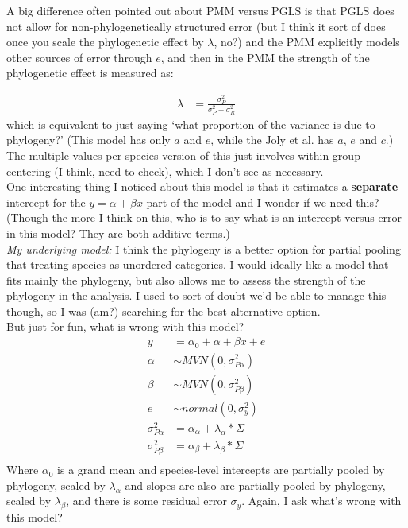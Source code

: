 \documentclass[11pt,letter]{article}
\begin{document}
A big difference often pointed out about PMM versus PGLS is that PGLS does not allow for non-phylogenetically structured error (but I think it sort of does once you scale the phylogenetic effect by $\lambda$, no?) and the PMM explicitly models other sources of error through $e$, and then in the PMM the strength of the phylogenetic effect is measured as:

\begin{align}
\lambda & = \frac{\sigma^2_P}{\sigma^2_P+\sigma^2_R}
\end{align}
which is equivalent to just saying `what proportion of the variance is due to phylogeny?' (This model has only $a$ and $e$, while the Joly et al. has $a$, $e$ and $c$.)\\

The multiple-values-per-species version of this just involves within-group centering (I think, need to check), which I don't see as necessary. \\

One interesting thing I noticed about this model is that it estimates a {\bf separate} intercept for the $y = \alpha + \beta x$ part of the model and I wonder if we need this? (Though the more I think on this, who is to say what is an intercept versus error in this model? They are both additive terms.) \\

\emph{My underlying model:} I think the phylogeny is a better option for partial pooling that treating species as unordered categories. I would ideally like a model that fits mainly the phylogeny, but also allows me to assess the strength of the phylogeny in the analysis. I used to sort of doubt we'd be able to manage this though, so I was (am?) searching for the best alternative option. \\

But just for fun, what is wrong with this model?\\

\begin{align}
y & = \alpha_0 + \alpha + \beta x + e\\
\alpha & \sim MVN(0, \sigma_{P\alpha}^2)\\
\beta & \sim MVN(0, \sigma_{P\beta}^2)\\
e & \sim normal(0, \sigma_y^2)\\
\sigma_{P\alpha}^2 & = \alpha_{\alpha} + \lambda_\alpha*\Sigma\\
\sigma_{P\beta}^2 & = \alpha_{\beta} + \lambda_\beta*\Sigma\\
\end{align}
Where $\alpha_0 $ is a grand mean and species-level intercepts are partially pooled by phylogeny, scaled by $\lambda_\alpha$ and slopes are also are partially pooled by phylogeny, scaled by $\lambda_\beta$, and there is some residual error $\sigma_y$. Again, I ask what's wrong with this model?\\
\end{document}
